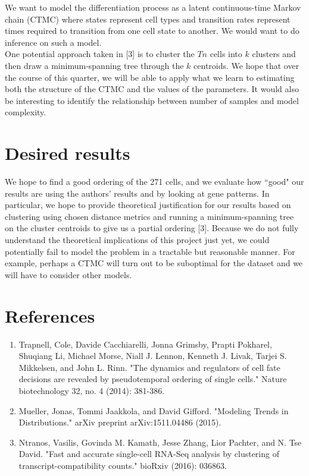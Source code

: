 \documentclass[11pt,onecolumn]{article}
\begin{document}
We want to model the differentiation process as a latent continuous-time Markov chain (CTMC) where states represent cell types and transition rates represent times required to transition from one cell state to another. We would want to do inference on such a model. \\

One potential approach taken in [3] is to cluster the $Tn$ cells into $k$ clusters and then draw a minimum-spanning tree through the $k$ centroids. We hope that over the course of this quarter, we will be able to apply what we learn to estimating both the structure of the CTMC and the values of the parameters. It would also be interesting to identify the relationship between number of samples and model complexity. 

\section{Desired results}
We hope to find a good ordering of the 271 cells, and we evaluate how ``good" our results are using the authors' results and by looking at gene patterns. In particular, we hope to provide theoretical justification for our results based on clustering using chosen distance metrics and running a minimum-spanning tree on the cluster centroids to give us a partial ordering [3]. Because we do not fully understand the theoretical implications of this project just yet, we could potentially fail to model the problem in a tractable but reasonable manner. For example, perhaps a CTMC will turn out to be suboptimal for the dataset and we will have to consider other models.

\section{References}
\begin{enumerate}
	\item Trapnell, Cole, Davide Cacchiarelli, Jonna Grimsby, Prapti Pokharel, Shuqiang Li, Michael Morse, Niall J. Lennon, Kenneth J. Livak, Tarjei S. Mikkelsen, and John L. Rinn. "The dynamics and regulators of cell fate decisions are revealed by pseudotemporal ordering of single cells." Nature biotechnology 32, no. 4 (2014): 381-386.
	\item Mueller, Jonas, Tommi Jaakkola, and David Gifford. "Modeling Trends in Distributions." arXiv preprint arXiv:1511.04486 (2015).
	\item Ntranos, Vasilis, Govinda M. Kamath, Jesse Zhang, Lior Pachter, and N. Tse David. "Fast and accurate single-cell RNA-Seq analysis by clustering of transcript-compatibility counts." bioRxiv (2016): 036863.
\end{enumerate}
\end{document}
